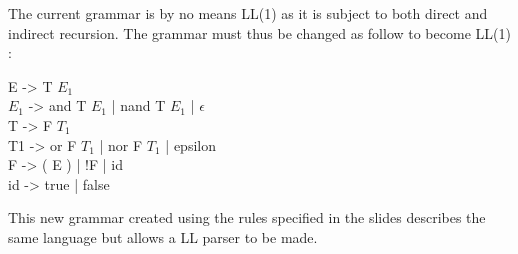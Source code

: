 \documentclass[a4paper, 11pt]{article}
\begin{document}
    	The current grammar is by no means LL(1) as it is subject to both direct and
    	indirect recursion. The grammar must thus be changed as follow to become LL(1) :
    	\newline
    	
    	\begin{flushleft}
    	E -> T $E_1$ \\
    	$E_1$ -> and T $E_1$ | nand T $E_1$ | $\epsilon$ \\
    	T -> F $T_1$ \\
		T1 -> or F $T_1$ | nor F $T_1$ | epsilon \\
		F -> ( E ) | !F | id \\
		id -> true | false \\
		\end{flushleft}

    	This new grammar created using the rules specified in the slides describes
    	the same language but allows a LL parser to be made.
\end{document}
